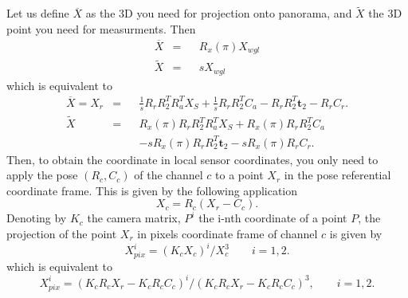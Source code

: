 \documentclass[a4paper, 11pt]{article}
\renewcommand{\tilde}{\widetilde}
\renewcommand{\t}{\mathbf{t}}
\begin{document}
   Let us define $\overline X $ as the 3D you need for projection onto panorama, and $\tilde X$ the 3D point you need 
   for measurments. Then 
   \begin{equation}
        \begin{aligned}
        \overline X & = && R_x(\pi) X_{wgl} \\
        \tilde X & = && s X_{wgl}
        \end{aligned}
   \end{equation}
   which is equivalent to 
      \begin{equation}
        \begin{aligned}
        \overline X = X_r & = && \frac{1}{s} R_r R_2^T R_a^T X_S + \frac{1}{s} R_r R_2^T C_a -R_r R_2^T \t_2 - R_r C_r. \\
        \tilde X & = && R_x(\pi) R_r R_2^T R_a^T X_S + R_x(\pi) R_r R_2^T C_a \\
            &&&       -s R_x(\pi) R_r R_2^T \t_2 - s R_x(\pi) R_r C_r.
        \end{aligned}
   \end{equation}
   Then, to obtain the coordinate in local sensor coordinates, you only need to apply the pose $(R_c, C_c)$ of the
   channel $c$ to a point $X_r$ in the pose referential coordinate frame. This is given by the following application
   \begin{equation}
       X_c = R_c (X_r - C_c).
   \end{equation}
   Denoting by $K_c$ the camera matrix, $P^i$ the i-nth coordinate of a point $P$, 
   the projection of the point $X_r$ in pixels coordinate frame of channel $c$ is given by
   \begin{equation}
        X_{pix}^i = (K_c X_c)^i / X_{c}^3 \qquad i=1,2.
   \end{equation}
   which is equivalent to 
   \begin{equation}
        X_{pix}^i = ( K_c R_c X_r - K_c R_c C_c )^i / ( K_c R_c X_r - K_c R_c C_c )^3, \qquad i=1,2.
   \end{equation}
\end{document}
